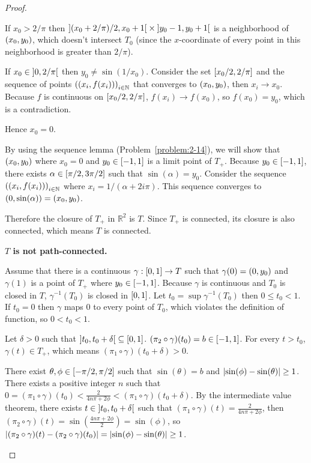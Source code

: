 \begin{proof}
\begin{enumerate}[label={(\alph*)}]
		      If $x_{0} > 2/\pi$ then $\left]{(x_{0} + 2/\pi)/2, x_{0} + 1}\right[ \times \left]{y_{0} - 1, y_{0} + 1}\right[$ is a neighborhood of $\left({x_{0}, y_{0}}\right)$, which doesn't intersect $T_{0}$ (since the $x$-coordinate of every point in this neighborhood is greater than $2/\pi$).

		      If $x_{0} \in \left]{0, 2/\pi}\right[$ then $y_{0} \ne \sin(1/x_{0})$. Consider the set $\left[{x_{0}/2, 2/\pi}\right]$ and the sequence of points ${(\left({x_{i}, f(x_{i})}\right))}_{i\in\mathbb{N}}$ that converges to $\left({x_{0}, y_{0}}\right)$, then $x_{i} \to x_{0}$. Because $f$ is continuous on $\left[{x_{0}/2, 2/\pi}\right]$, $f(x_{i}) \to f(x_{0})$, so $f(x_{0}) = y_{0}$, which is a contradiction.

		      Hence $x_{0} = 0$.

		      By using the sequence lemma (Problem~\ref{problem:2-14}), we will show that $\left({x_{0}, y_{0}}\right)$ where $x_{0} = 0$ and $y_{0} \in \left[{-1,1}\right]$ is a limit point of $T_{+}$. Because $y_{0} \in \left[{-1,1}\right]$, there exists $\alpha \in \left[{\pi/2, 3\pi/2}\right]$ such that $\sin(\alpha) = y_{0}$. Consider the sequence ${(\left({x_{i}, f(x_{i})}\right))}_{i\in\mathbb{N}}$ where $x_{i} = 1/(\alpha + 2i\pi)$. This sequence converges to $\left({0, \sin(\alpha)}\right) = \left({x_{0}, y_{0}}\right)$.

		      Therefore the closure of $T_{+}$ in $\mathbb{R}^{2}$ is $T$. Since $T_{+}$ is connected, its closure is also connected, which means $T$ is connected.

		      \textbf{$T$ is not path-connected.}

		      Assume that there is a continuous $\gamma: \left[{0, 1}\right] \to T$ such that $\gamma(0) = \left({0, y_{0}}\right)$ and $\gamma(1)$ is a point of $T_{+}$ where $y_{0}\in\left[{-1,1}\right]$. Because $\gamma$ is continuous and $T_{0}$ is closed in $T$, $\gamma^{-1}(T_{0})$ is closed in $\left[{0,1}\right]$. Let $t_{0} = \sup \gamma^{-1}(T_{0})$ then $0\leq t_{0} < 1$. If $t_{0} = 0$ then $\gamma$ maps 0 to every point of $T_{0}$, which violates the definition of function, so $0 < t_{0} < 1$.

		      Let $\delta > 0$ such that $\left]{t_{0}, t_{0} + \delta}\right[ \subseteq \left[{0, 1}\right]$. $(\pi_{2} \circ \gamma)(t_{0}) = b \in \left[{-1,1}\right]$. For every $t > t_{0}$, $\gamma(t) \in T_{+}$, which means $(\pi_{1}\circ\gamma)(t_{0} + \delta) > 0$.

		      There exist $\theta, \phi \in \left[{-\pi/2, \pi/2}\right]$ such that $\sin(\theta) = b$ and $\left\vert{\sin(\phi) - \sin(\theta)}\right\vert \geq 1$. There exists a positive integer $n$ such that $0 = (\pi_{1}\circ \gamma)(t_{0}) < \frac{2}{4n\pi + 2\phi} < (\pi_{1}\circ\gamma)(t_{0} + \delta)$. By the intermediate value theorem, there exists $t \in \left]{t_{0}, t_{0} + \delta}\right[$ such that $(\pi_{1}\circ \gamma)(t) = \frac{2}{4n\pi + 2\phi}$, then $(\pi_{2}\circ \gamma)(t) = \sin \left(\frac{4n\pi + 2\phi}{2}\right) = \sin(\phi)$, so $\left\vert{ (\pi_{2}\circ \gamma)(t) - (\pi_{2}\circ \gamma)(t_{0}) }\right\vert = \left\vert{ \sin(\phi) - \sin(\theta) }\right\vert \geq 1$.


\end{enumerate}
\end{proof}
